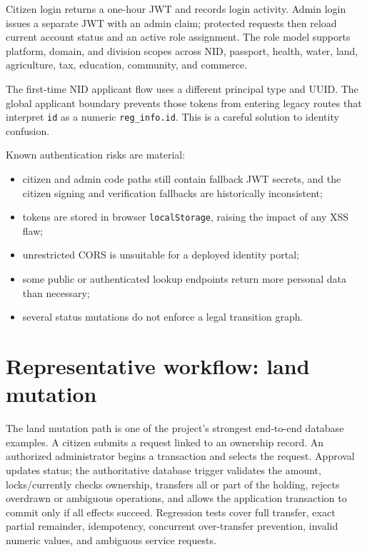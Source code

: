 \documentclass[12pt,a4paper,oneside]{report}
\newcommand{\code}[1]{\texttt{#1}}
\begin{document}
Citizen login returns a one-hour JWT and records login activity. Admin login issues a separate JWT
with an admin claim; protected requests then reload current account status and an active role
assignment. The role model supports platform, domain, and division scopes across NID, passport,
health, water, land, agriculture, tax, education, community, and commerce.

The first-time NID applicant flow uses a different principal type and UUID. The global applicant
boundary prevents those tokens from entering legacy routes that interpret \code{id} as a numeric
\code{reg\_info.id}. This is a careful solution to identity confusion.

Known authentication risks are material:

\begin{itemize}
  \item citizen and admin code paths still contain fallback JWT secrets, and the citizen signing
        and verification fallbacks are historically inconsistent;
  \item tokens are stored in browser \code{localStorage}, raising the impact of any XSS flaw;
  \item unrestricted CORS is unsuitable for a deployed identity portal;
  \item some public or authenticated lookup endpoints return more personal data than necessary;
  \item several status mutations do not enforce a legal transition graph.
\end{itemize}

\section{Representative workflow: land mutation}

The land mutation path is one of the project's strongest end-to-end database examples. A citizen
submits a request linked to an ownership record. An authorized administrator begins a transaction
and selects the request. Approval updates status; the authoritative database trigger validates the
amount, locks/currently checks ownership, transfers all or part of the holding, rejects overdrawn
or ambiguous operations, and allows the application transaction to commit only if all effects
succeed. Regression tests cover full transfer, exact partial remainder, idempotency, concurrent
over-transfer prevention, invalid numeric values, and ambiguous service requests.
\end{document}
